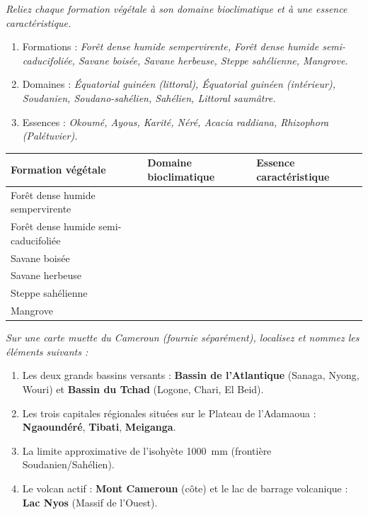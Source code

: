 \documentclass[11pt]{article}
\begin{document}
\begin{exercice}
\emph{Reliez chaque formation végétale à son domaine bioclimatique et à une essence caractéristique.}
\begin{enumerate}
    \item Formations : \textit{Forêt dense humide sempervirente, Forêt dense humide semi-caducifoliée, Savane boisée, Savane herbeuse, Steppe sahélienne, Mangrove.}
    \item Domaines : \textit{Équatorial guinéen (littoral), Équatorial guinéen (intérieur), Soudanien, Soudano-sahélien, Sahélien, Littoral saumâtre.}
    \item Essences : \textit{Okoumé, Ayous, Karité, Néré, Acacia raddiana, Rhizophora (Palétuvier).}
\end{enumerate}
\begin{tabularx}{\linewidth}{|X|X|X|}
\hline
\textbf{Formation végétale} & \textbf{Domaine bioclimatique} & \textbf{Essence caractéristique} \\
\hline
Forêt dense humide sempervirente & & \\
\hline
Forêt dense humide semi-caducifoliée & & \\
\hline
Savane boisée & & \\
\hline
Savane herbeuse & & \\
\hline
Steppe sahélienne & & \\
\hline
Mangrove & & \\
\hline
\end{tabularx}
\end{exercice}

\begin{exercice}
\emph{Sur une carte muette du Cameroun (fournie séparément), localisez et nommez les éléments suivants :}
\begin{enumerate}
    \item Les deux grands bassins versants : \textbf{Bassin de l'Atlantique} (Sanaga, Nyong, Wouri) et \textbf{Bassin du Tchad} (Logone, Chari, El Beid).
    \item Les trois capitales régionales situées sur le Plateau de l'Adamaoua : \textbf{Ngaoundéré}, \textbf{Tibati}, \textbf{Meiganga}.
    \item La limite approximative de l'isohyète \SI{1000}{\milli\meter} (frontière Soudanien/Sahélien).
    \item Le volcan actif : \textbf{Mont Cameroun} (côte) et le lac de barrage volcanique : \textbf{Lac Nyos} (Massif de l'Ouest).
\end{enumerate}
\end{exercice}
\end{document}

